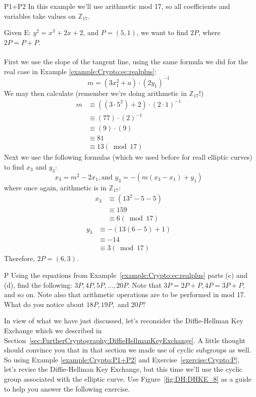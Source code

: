 \begin{example}{P1+P2} In this example we'll use arithmetic mod 17, so  all coefficients and variables take values on $\mathbb{Z}_{17}$.  

Given E: $y^2 = x^3 + 2x + 2$, and $P = (5,1)$,  we want to find $2P$, where $2P = P + P$.\\ \\
First we use the slope of the tangent line, using the same formula we did for the real case in Example \ref{example:Crypto:ec:realplus}:	
\[m = (3x_1^2 + a) \cdot (2y_1)^{-1}\]	
We may then calculate (remember we're doing arithmetic in  $\mathbb{Z}_{17}$!)
\begin{align*}
		m &\equiv ( (3 \cdot 5^2) + 2) \cdot (2 \cdot 1)^{-1} \\
	          &\equiv  (77) \cdot (2)^{-1} \\
                     &\equiv (9) \cdot (9)\\
                     &\equiv 81 \\
                    &\equiv 13 (\bmod 17)
		\end{align*}
Next we use the following formulas (which we used before for reall elliptic curves) to find $x_3$ and $y_3$: \[ x_3 = m^2 - 2x_1  , \text{and~} y_3 =-(  m(x_3 - x_1)+y_1)\]
where once again, arithmetic is in $\mathbb{Z}_{17}$:
\begin{align*}
		x_3 &\equiv  (13^2 - 5 - 5 ) \\
	          &\equiv 159\\
                     &\equiv 6 (\bmod 17)
		\end{align*}
			\begin{align*}
		y_3 &\equiv - (13(6 - 5) +1) \\
	          &\equiv -14\\
                     &\equiv 3 (\bmod 17)
		\end{align*}
Therefore, $2P = (6,3)$.
\end{example}
\begin{exercise}{P}
Using the equations from Example~\ref{example:Crypto:ec:realplus} parts (c) and (d), find the following: $3P, 4P, 5P, ..., 20P.$  Note that $3P = 2P + P,  4P = 3P +P,$ and so on. Note also that arithmetic operations are to be performed in mod 17.  What do you notice about $18P,  19P,$ and $20P?$
\end{exercise}
In view of what we have just discussed, let's reconsider the Diffie-Hellman Key Exchange which we described in Section~\ref{sec:FurtherCryptography:DiffieHellmanKeyExchange}. A little thought should convince you that in that section we made use of cyclic subgroups as well. So using Example \ref{example:Crypto:P1+P2} and Exercise~\ref{exercise:Crypto:P}, let's revise the Diffie-Hellman Key Exchange, but this time we'll use the cyclic group associated with the elliptic curve.  Use Figure~\ref{fig:DH:DHKE_8} as a guide to help you answer the following exercise.

